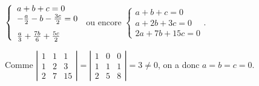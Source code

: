 {{\begin{center}
$\left\{
\begin{array}{l}
a+b+c=0\\
-\frac{a}{2}-b-\frac{3c}{2}=0\\
\rule{0mm}{6mm}\frac{a}{3}+\frac{7b}{6}+\frac{5c}{2}
\end{array}
\right.$ ou encore $\left\{
\begin{array}{l}
a+b+c=0\\
a+2b+3c=0\\
2a+7b+15c=0
\end{array}
\right.$.
 \end{center}
 
 
Comme $\left|
\begin{array}{ccc}
1&1&1\\
1&2&3\\
2&7&15
\end{array}
\right|=\left|
\begin{array}{ccc}
1&0&0\\
1&1&1\\
2&5&8
\end{array}
\right|=3\neq0$, on a donc $a=b=c=0$.
}
}
